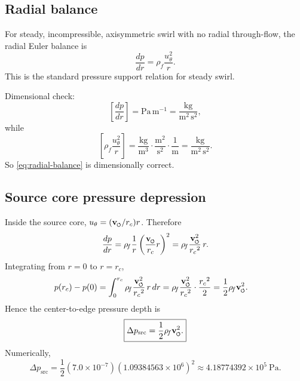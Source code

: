 \documentclass[11pt]{article}
\newcommand{\swirlarrow}{\mathchoice{\mkern-2mu\scriptstyle\boldsymbol{\circlearrowleft}}{\mkern-2mu\scriptstyle\boldsymbol{\circlearrowleft}}{\mkern-2mu\scriptscriptstyle\boldsymbol{\circlearrowleft}}{\mkern-2mu\scriptscriptstyle\boldsymbol{\circlearrowleft}}}
\newcommand{\vswirl}{\mathbf{v}_{\swirlarrow}}
\newcommand{\rhoF}{\rho_{\!f}}
\newcommand{\rc}{{r_c}}
\newcommand{\src}{\mathrm{src}}
\begin{document}
        \subsection{Radial balance}
            
            For steady, incompressible, axisymmetric swirl with no radial through-flow, the radial Euler balance is
            \begin{equation}
                \frac{dp}{dr}
                =
                \rhoF \frac{u_\theta^2}{r}.
                \label{eq:radial-balance}
            \end{equation}
            This is the standard pressure support relation for steady swirl.
            
            Dimensional check:
            \[
                \left[\frac{dp}{dr}\right]
                =
                \mathrm{Pa\,m^{-1}}
                =
                \frac{\mathrm{kg}}{\mathrm{m^2\,s^2}},
            \]
            while
            \[
                \left[\rhoF \frac{u_\theta^2}{r}\right]
                =
                \frac{\mathrm{kg}}{\mathrm{m^3}}\cdot \frac{\mathrm{m^2}}{\mathrm{s^2}}\cdot \frac{1}{\mathrm{m}}
                =
                \frac{\mathrm{kg}}{\mathrm{m^2\,s^2}}.
            \]
            So \eqref{eq:radial-balance} is dimensionally correct.
        
        \subsection{Source core pressure depression}
            
            Inside the source core, \(u_\theta = (\vswirl/\rc) r\). Therefore
            \begin{equation}
                \frac{dp}{dr}
                =
                \rhoF \frac{1}{r}\left(\frac{\vswirl}{\rc}r\right)^2
                =
                \rhoF \frac{\vswirl^2}{\rc^2}\,r.
                \label{eq:dpdr-core}
            \end{equation}
            Integrating from \(r=0\) to \(r=\rc\),
            \begin{align}
                p(\rc)-p(0)
                &=
                \int_0^\rc \rhoF \frac{\vswirl^2}{\rc^2}\,r\,dr
                =
                \rhoF \frac{\vswirl^2}{\rc^2}\cdot \frac{\rc^2}{2}
                =
                \frac{1}{2}\rhoF \vswirl^2.
            \end{align}
            Hence the center-to-edge pressure depth is
            \begin{equation}
                \boxed{
                    \Delta p_{\src}
                    =
                    \frac{1}{2}\rhoF \vswirl^2.
                }
                \label{eq:dp-core}
            \end{equation}
            Numerically,
            \begin{equation}
                \Delta p_{\src}
                =
                \frac{1}{2}(7.0\times 10^{-7})(1.09384563\times 10^6)^2
                \approx
                4.18774392\times 10^5\ \mathrm{Pa}.
                \label{eq:dp-core-numeric}
            \end{equation}
        
\end{document}
